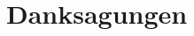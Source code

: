 \documentclass[12pt,journal,compsoc]{IEEEtran}
\begin{document}






%





\ifCLASSOPTIONcompsoc
  \section*{Danksagungen}
\else
\end{document}
